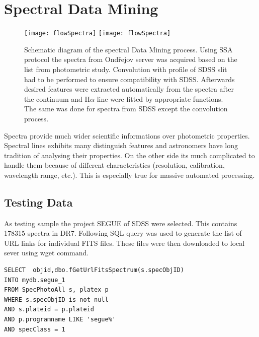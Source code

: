 \section{Spectral Data Mining}

   \begin{figure}[!htbp]
      \begin{center}
        \leavevmode
        \ifpdf
        \texttt{[image: flowSpectra]}
        \else
        \texttt{[image: flowSpectra]}
        \fi
        \caption{Schematic diagram of the spectral Data Mining
          process. Using SSA protocol the spectra from Ondřejov server
          was acquired based on the list from photometric study. %
          Convolution with profile of SDSS slit had to be performed to
          ensure compatibility with SDSS. Afterwards desired features
          were extracted automatically from the spectra after the
          continuum and H$\alpha$ line were fitted by appropriate
          functions. The same was done for spectra from SDSS except
          the convolution process.}
        \label{FigFlowSpectra}
      \end{center}
    \end{figure}

 

Spectra provide much wider scientific informations over photometric
properties. Spectral lines exhibits many distinguish features and
astronomers have long tradition of analysing their properties. On the
other side its much complicated to handle them because of different
characteristics (resolution, calibration, wavelength range, etc.). This
is especially true for massive automated processing.  

\subsection{Testing Data}
As testing sample the project SEGUE of SDSS were selected. This
contains 178315 spectra in DR7. Following SQL query was used to
generate the list of URL links for individual FITS files. These files
were then downloaded to local sever using wget command.

\begin{lstlisting}
SELECT  objid,dbo.fGetUrlFitsSpectrum(s.specObjID)                                                           
INTO mydb.segue_1                                                                                     
FROM SpecPhotoAll s, platex p                                                                         
WHERE s.specObjID is not null                                                                         
AND s.plateid = p.plateid                                                                             
AND p.programname LIKE 'segue%'                                                                       
AND specClass = 1
\end{lstlisting}

